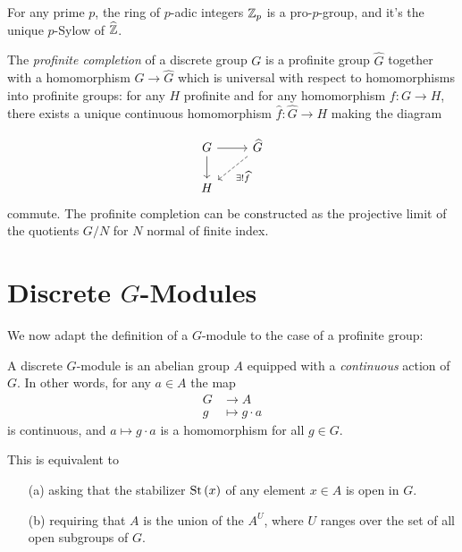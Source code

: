 \documentclass[a4paper, oneside]{memoir}
\begin{document}
\begin{example}
	For any prime $p$, the ring of $p$-adic integers $\mathbb{Z}_p$ is a pro-$p$-group, and it's the unique $p$-Sylow of $\widehat{\mathbb{Z}}$.
\end{example}

\begin{example}
	The \textit{profinite completion} of a discrete group $G$ is a profinite group $\widehat{G}$ together with a homomorphism $G\to\widehat{G}$ which is universal with respect to homomorphisms into profinite groups: for any $H$ profinite and for any homomorphism $f:G\to H$, there exists a unique continuous homomorphism $\widehat{f}:\widehat{G}\to H$ making the diagram

	\[
		\begin{tikzcd}
			G \arrow[r] \arrow[d] & \widehat{G} \arrow[dl, dashed, "\exists!\widehat{f}"] \\
			H
		\end{tikzcd}
	\]
	commute. The profinite completion can be constructed as the projective limit of the quotients $G/N$ for $N$ normal of finite index.
\end{example}

\section{\texorpdfstring{Discrete $G$-Modules}{Discrete G-Modules}}

We now adapt the definition of a $G$-module to the case of a profinite group:

\begin{definition}
	A discrete $G$-module is an abelian group $A$ equipped with a \textit{continuous} action of $G$. In other words, for any $a\in A$ the map
	\begin{align*}
		G & \to A            \\
		g & \mapsto g\cdot a
	\end{align*}
	is continuous, and $a\mapsto g\cdot a$ is a homomorphism for all $g\in G$.
\end{definition}

\begin{remark}\label{rm:discGmodUnion}
	This is equivalent to
	\begin{itemize}
		\item[(a)] asking that the stabilizer $\operatorname{St}{(x)}$ of any element $x \in A$ is open in $G$.
		\item[(b)] requiring that $A$ is the union of the $A^U$, where $U$ ranges over the set of all open subgroups of $G$.
	\end{itemize}
\end{remark}
\end{document}
